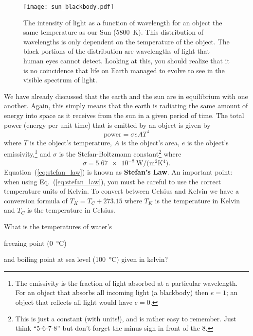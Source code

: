         \begin{figure}[ht]
            \centering
            \texttt{[image: sun\_blackbody.pdf]}
            \caption{The intensity of light as a function of wavelength for an object the same temperature as our Sun (\SI{5800}{\kelvin}). This distribution of wavelengths is only dependent on the temperature of the object. The black portions of the distribution are wavelengths of light that human eyes cannot detect. Looking at this, you should realize that it is no coincidence that life on Earth managed to evolve to see in the visible spectrum of light.}
            \label{fig:sun_bb}
        \end{figure}

        We have already discussed that the earth and the sun are in equilibrium with one another. Again, this simply means that the earth is radiating the same amount of energy into space as it receives from the sun in a given period of time. The total power (energy per unit time) that is emitted by an object is given by
        \begin{equation}
            \text{power} = \sigma e A T^4
            \label{eq:stefan_law}
        \end{equation}
        where $T$ is the object's temperature, $A$ is the object's area, $e$ is the object's emissivity,\footnote
        {
            The emissivity is the fraction of light absorbed at a particular wavelength. For an object that absorbs all incoming light (a blackbody) then $e = 1$; an object that reflects all light would have $e = 0$.
        } 
        and $\sigma$ is the Stefan-Boltzmann constant\footnote
        {
            This is just a constant (with units!), and is rather easy to remember. Just think ``5-6-7-8'' but don't forget the minus sign in front of the 8.
        } 
        where 
        \begin{equation}
            \sigma = \SI[per-mode=fraction]{5.67e-8}{\watt \per (\meter^2  \kelvin^4)}. 
        \end{equation}
        Equation~(\ref{eq:stefan_law}) is known as \textbf{Stefan's Law}. An important point: when using Eq.~(\ref{eq:stefan_law}), you must be careful to use the correct temperature units of Kelvin. To convert between Celsius and Kelvin we have a conversion formula of $T_K = T_C + 273.15$ where $T_K$ is the temperature in Kelvin and $T_C$ is the temperature in Celsius.

        \begin{exercise}
            What is the temperatures of water's
            \begin{enumerate*}[(a)]
                \item  freezing point (\SI{0}{\celsius})
                \item and boiling point at sea level (\SI{100}{\celsius})
                given in kelvin?
            \end{enumerate*}
        \label{ex:kelvin}
        \end{exercise}


